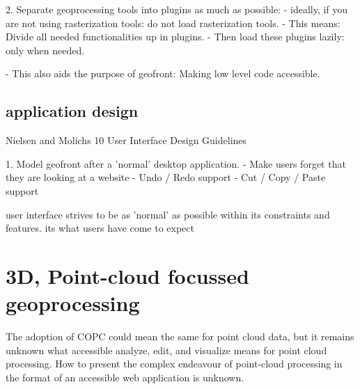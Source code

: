 2. Separate geoprocessing tools into plugins as much as possible: 
  - ideally, if you are not using rasterization tools: do not load rasterization tools. 
  - This means: Divide all needed functionalities up in plugins.
     - Then load these plugins lazily: only when needed.

  - This also aids the purpose of geofront: Making low level code accessible.

\subsection{application design}

Nielsen and Molichs 10 User Interface Design Guidelines

1. Model geofront after a 'normal' desktop application.  
  - Make users forget that they are looking at a website
  - Undo / Redo support
  - Cut / Copy / Paste support

  user interface strives to be as 'normal' as possible within its constraints and features. its what users have come to expect



\section{3D, Point-cloud focussed geoprocessing}

The adoption of COPC could mean the same for point cloud data, but it remains unknown what accessible analyze, edit, and visualize means for point cloud processing. 
How to present the complex endeavour of point-cloud processing in the format of an accessible web application is unknown. 



